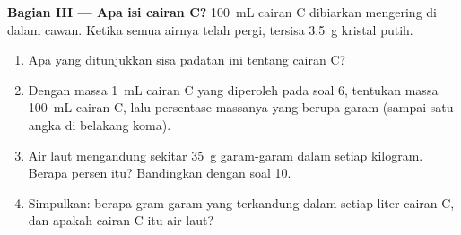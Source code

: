 \begin{problem}
\medskip
\noindent\textbf{Bagian III --- Apa isi cairan C?}
\qty{100}{mL} cairan C dibiarkan mengering di dalam cawan. Ketika semua
airnya telah pergi, tersisa \qty{3.5}{g} kristal putih.
\begin{enumerate}[resume]
  \item Apa yang ditunjukkan sisa padatan ini tentang cairan C?
  \item Dengan massa \qty{1}{mL} cairan C yang diperoleh pada soal 6,
        tentukan massa \qty{100}{mL} cairan C, lalu persentase massanya
        yang berupa garam (sampai satu angka di belakang koma).
  \item Air laut mengandung sekitar \qty{35}{g} garam-garam dalam setiap
        kilogram. Berapa persen itu? Bandingkan dengan soal 10.
  \item Simpulkan: berapa gram garam yang terkandung dalam setiap liter
        cairan C, dan apakah cairan C itu air laut?
\end{enumerate}
\end{problem}
